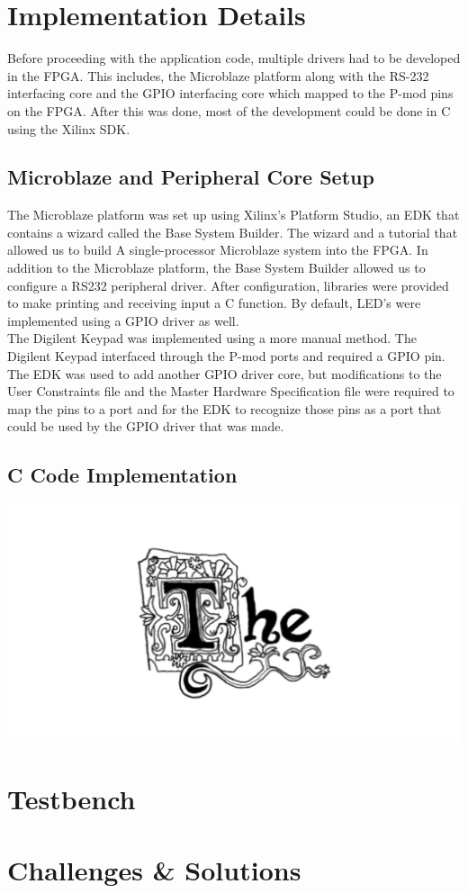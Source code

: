 \documentclass[11pt]{article}
\begin{document}
\section{Implementation Details}
Before proceeding with the application code, multiple drivers had to be developed in the FPGA. This includes, the Microblaze platform along with the RS-232 interfacing core and the GPIO interfacing core which mapped to the P-mod pins on the FPGA. After this was done, most of the development could be done in C using the Xilinx SDK. 

\subsection{Microblaze and Peripheral Core Setup}
The Microblaze platform was set up using Xilinx's Platform Studio, an EDK that contains a wizard called the Base System Builder.  The wizard and a tutorial that allowed us to build A single-processor Microblaze system into the FPGA. In addition to the Microblaze platform, the Base System Builder allowed us to configure a RS232 peripheral driver. After configuration, libraries were provided to make printing and receiving input a C function. By default, LED's were implemented using a GPIO driver as well.  \\
The Digilent Keypad was implemented using a more manual method. The Digilent Keypad interfaced through the P-mod ports and required a GPIO pin. The EDK was used to add another GPIO driver core, but modifications to the User Constraints file and the Master Hardware Specification file were required to map the pins to a port and for the EDK to recognize those pins as a port that could be used by the GPIO driver that was made. 

\subsection{C Code Implementation}
\includegraphics[scale=0.2]{procrastination}


\section{Testbench}


\section{Challenges \& Solutions}
\end{document}
